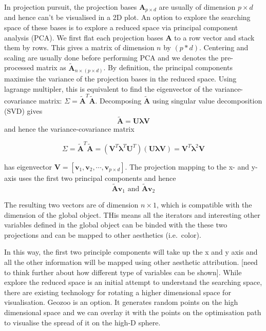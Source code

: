 \documentclass[12pt]{article}
\begin{document}
In projection pursuit, the projection bases \(\mathbf{A}_{p \times d}\)
are usually of dimension \(p \times d\) and hence can't be visualised in
a 2D plot. An option to explore the searching space of these bases is to
explore a reduced space via principal component analysis (PCA). We first
flat each projection bases \(\mathbf{A}\) to a row vector and stack them
by rows. This gives a matrix of dimension \(n\) by \((p*d)\). Centering
and scaling are usually done before performing PCA and we denotes the
pre-processed matrix as \(\tilde{\mathbf{A}}_{n \times (p \times d)}\).
By definition, the principal components maximise the variance of the
projection bases in the reduced space. Using lagrange multipler, this is
equivalent to find the eigenvector of the variance-covariance matrix:
\(\Sigma = \tilde{\mathbf{A}}^T\tilde{\mathbf{A}}\). Decomposing
\(\tilde{\mathbf{A}}\) using singular value decomposition (SVD) gives
\[\tilde{\mathbf{A}} = \mathbf{U} \mathbf{\lambda} \mathbf{V}\] and
hence the variance-covariance matrix

\[\Sigma = \tilde{\mathbf{A}}^T\tilde{\mathbf{A}} = (\mathbf{V}^T \mathbf{\lambda}^T \mathbf{U}^T) (\mathbf{U} \mathbf{\lambda} \mathbf{V}) = \mathbf{V}^T \mathbf{\lambda}^2 \mathbf{V}\]

has eigenvector
\(\mathbf{V} = [\mathbf{v}_1, \mathbf{v}_2, \cdots, \mathbf{v}_{p\times d}]\).
The projection mapping to the x- and y-axis uses the first two principal
components and hence
\[\tilde{\mathbf{A}} \mathbf{v}_1 \text{ and } \tilde{\mathbf{A}} \mathbf{v}_2\]

The resulting two vectors are of dimension \(n \times 1\), which is
compatible with the dimension of the global object. THis means all the
iterators and interesting other variables defined in the global object
can be binded with the these two projections and can be mapped to other
aesthetics (i.e.~color).

In this way, the first two principle components will take up the x and y
axis and all the other information will be mapped using other aesthetic
attribution. {[}need to think further about how different type of
variables can be shown{]}. While explore the reduced space is an initial
attempt to understand the searching space, there are existing technology
for rotating a higher dimensional space for visualisation. Geozoo is an
option. It generates random points on the high dimensional space and we
can overlay it with the points on the optimisation path to visualise the
spread of it on the high-D sphere.
\end{document}
